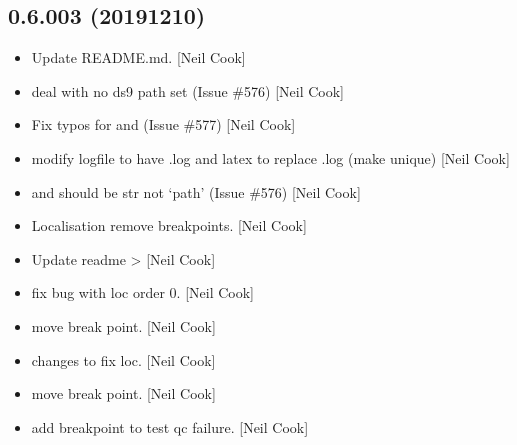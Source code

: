 \documentclass[a4paper,10pt,english]{report}
\begin{document}
\subsection{0.6.003 (2019\sphinxhyphen{}12\sphinxhyphen{}10)}
\label{\detokenize{misc/changelog:id34}}\begin{itemize}
\item {} 
Update README.md. {[}Neil Cook{]}

\item {} 
 \sphinxhyphen{} deal with no ds9 path set
(Issue \#576) {[}Neil Cook{]}

\item {} 
Fix typos for  and  (Issue \#577) {[}Neil Cook{]}

\item {} 
 \sphinxhyphen{} modify logfile to have .log
and latex to replace .log (make unique) {[}Neil Cook{]}

\item {} 
 \sphinxhyphen{}  and
 should be str not ‘path’ (Issue \#576) {[}Neil Cook{]}

\item {} 
Localisation \sphinxhyphen{} remove breakpoints. {[}Neil Cook{]}

\item {} 
Update readme  \textendash{}\textgreater{}  {[}Neil Cook{]}

\item {} 
 \sphinxhyphen{} fix bug with loc order 0. {[}Neil Cook{]}

\item {} 
 \sphinxhyphen{} move break point. {[}Neil Cook{]}

\item {} 
 \sphinxhyphen{} changes to fix loc. {[}Neil Cook{]}

\item {} 
 \sphinxhyphen{} move break point. {[}Neil Cook{]}

\item {} 
 \sphinxhyphen{} add breakpoint to test qc failure. {[}Neil Cook{]}


\end{itemize}
\end{document}
